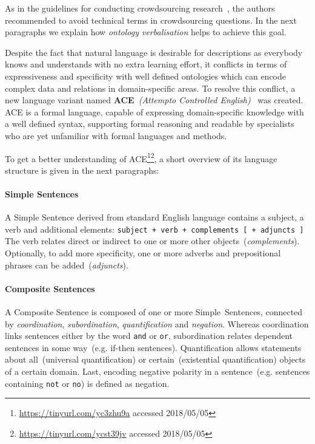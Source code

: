 \documentclass[draft,final]{vutinfth} %
\begin{document}
As in the guidelines for conducting crowdsourcing research~\cite{sarasua2015crowdsourcing}, the authors recommended to avoid technical terms in crowdsourcing questions. In the next paragraphs we explain how \textit{ontology verbalisation} helps to achieve this goal. 

Despite the fact that natural language is desirable for descriptions as everybody knows and understands with no extra learning effort, it conflicts in terms of expressiveness and specificity with well defined ontologies which can encode complex data and relations in domain-specific areas. To resolve this conflict, a new language variant named \textbf{ACE}~\textit{(Attempto Controlled English)}~\cite{fuchs2008} was created. ACE is a formal language, capable of expressing domain-specific knowledge with a well defined syntax, supporting formal reasoning and readable by specialists who are yet unfamiliar with formal languages and methods.

To get a better understanding of ACE\footnote{\url{https://tinyurl.com/yc3zhu9a} accessed 2018/05/05}\footnote{\url{https://tinyurl.com/ycst39jv} accessed 2018/05/05}, a short overview of its language structure is given in the next paragraphs:
 
\paragraph{Simple Sentences} A Simple Sentence derived from standard English language contains a subject, a verb and additional elements: \texttt{subject + verb + complements [ + adjuncts ]} The verb relates direct or indirect to one or more other objects~(\textit{complements}). Optionally, to add more specificity, one or more adverbs and prepositional phrases can be added~(\textit{adjuncts}). 

\paragraph{Composite Sentences} A Composite Sentence is composed of one or more Simple~Sentences, connected by \textit{coordination},
\textit{subordination}, \textit{quantification} and \textit{negation}. Whereas coordination links sentences either by the word \texttt{and} or \texttt{or}, subordination relates dependent sentences in some way~(e.g. if-then sentences). Quantification allows statements about all~(universal quantification) or certain~(existential quantification) objects of a certain domain. Last, encoding negative polarity in a sentence~(e.g. sentences containing \texttt{not} or \texttt{no}) is defined as negation. 
\end{document}
